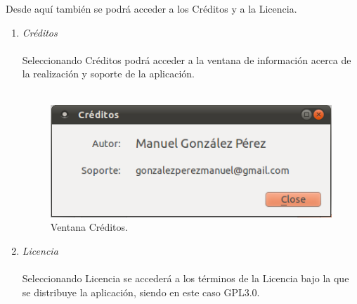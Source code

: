 \begin{enumerate}
Desde aquí también se podrá acceder a los Créditos y a la Licencia.\\
\begin{enumerate}
\item \textit{Créditos}\\\\
Seleccionando Créditos podrá acceder a la ventana de información acerca de la realización y soporte de la aplicación.\\\\
\begin{figure}[H]
  \label{creditos}
  \begin{center}
    \includegraphics[scale=0.5]{../../Image/creditos.png}
  \end{center}
  \caption{Ventana Créditos.}
\end{figure}

\item \textit{Licencia}\\\\
Seleccionando Licencia se accederá a los términos de la Licencia bajo la que se distribuye la aplicación, siendo en este caso GPL3.0.\\\\
\end{enumerate}
\end{enumerate}


